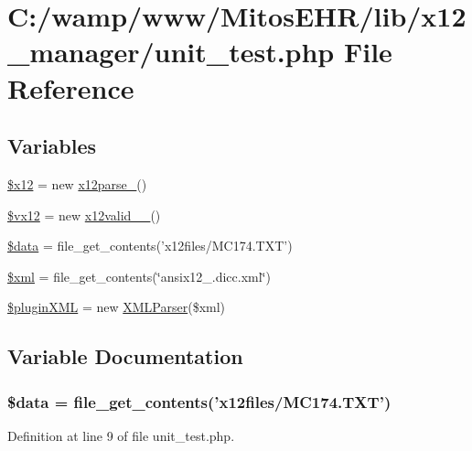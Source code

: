 \hypertarget{unit__test_8php}{\section{\-C\-:/wamp/www/\-Mitos\-E\-H\-R/lib/x12\-\_\-manager/unit\-\_\-test.php \-File \-Reference}
\label{unit__test_8php}
}
\subsection*{\-Variables}
\begin{DoxyCompactItemize}
\item 
\hyperlink{unit__test_8php_a45642999bffdb0dfbf3e7d12a9d2e431}{\$x12} = new \hyperlink{classx12parse__4010}{x12parse\-\_}()
\item 
\hyperlink{unit__test_8php_a58edce330f12eb9ca3236c741d52b111}{\$vx12} = new \hyperlink{classx12valid__837__4010}{x12valid\-\_\-\_}()
\item 
\hyperlink{unit__test_8php_a6efc15b5a2314dd4b5aaa556a375c6d6}{\$data} = file\-\_\-get\-\_\-contents('x12files/\-M\-C174.\-T\-X\-T')
\item 
\hyperlink{unit__test_8php_aa108d9d91e700ac530401dd363b0723b}{\$xml} = file\-\_\-get\-\_\-contents(\char`\"{}ansix12\-\_.\-dicc.\-xml\char`\"{})
\item 
\hyperlink{unit__test_8php_af15694db34a7234a2b68004854ad84ca}{\$plugin\-X\-M\-L} = new \hyperlink{class_x_m_l_parser}{\-X\-M\-L\-Parser}(\$xml)
\end{DoxyCompactItemize}


\subsection{\-Variable \-Documentation}
\hypertarget{unit__test_8php_a6efc15b5a2314dd4b5aaa556a375c6d6}{
\subsubsection[{\$data}]{\setlength{\rightskip}{0pt plus 5cm}\$data = file\-\_\-get\-\_\-contents('x12files/\-M\-C174.\-T\-X\-T')}}\label{unit__test_8php_a6efc15b5a2314dd4b5aaa556a375c6d6}


\-Definition at line 9 of file unit\-\_\-test.\-php.

